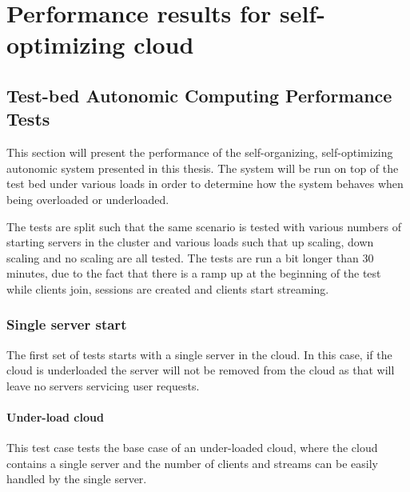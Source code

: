 \chapter{Performance results for self-optimizing cloud} %
\label{Chapter_performance}

\section{Test-bed Autonomic Computing Performance Tests}

This section will present the performance of the self-organizing, self-optimizing autonomic system presented in this thesis. The system will be run on top of the test bed under various loads in order to determine how the system behaves when being overloaded or underloaded.

The tests are split such that the same scenario is tested with various numbers of starting servers in the cluster and various loads such that up scaling, down scaling and no scaling are all tested. The tests are run a bit longer than 30 minutes, due to the fact that there is a ramp up at the beginning of the test while clients join, sessions are created and clients start streaming.

\subsection{Single server start}

The first set of tests starts with a single server in the cloud. In this case, if the cloud is underloaded the server will not be removed from the cloud as that will leave no servers servicing user requests.

\subsubsection{Under-load cloud}

This test case tests the base case of an under-loaded cloud, where the cloud contains a single server and the number of clients and streams can be easily handled by the single server.

